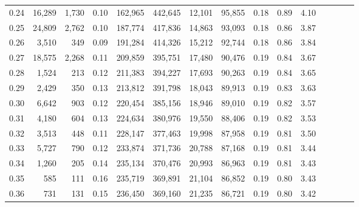 \begin{tabular}{rrrcrrrrrrrrrrr}
0.24 &  16,289 &  1,730 &                                       0.10 &  162,965 &  442,645 &   12,101 &   95,855 &  0.18 &  0.89 &                         4.10 \\
0.25 &  24,809 &  2,762 &                                       0.10 &  187,774 &  417,836 &   14,863 &   93,093 &  0.18 &  0.86 &                         3.87 \\
0.26 &   3,510 &    349 &                                       0.09 &  191,284 &  414,326 &   15,212 &   92,744 &  0.18 &  0.86 &                         3.84 \\
0.27 &  18,575 &  2,268 &                                       0.11 &  209,859 &  395,751 &   17,480 &   90,476 &  0.19 &  0.84 &                         3.67 \\
0.28 &   1,524 &    213 &                                       0.12 &  211,383 &  394,227 &   17,693 &   90,263 &  0.19 &  0.84 &                         3.65 \\
0.29 &   2,429 &    350 &                                       0.13 &  213,812 &  391,798 &   18,043 &   89,913 &  0.19 &  0.83 &                         3.63 \\
0.30 &   6,642 &    903 &                                       0.12 &  220,454 &  385,156 &   18,946 &   89,010 &  0.19 &  0.82 &                         3.57 \\
0.31 &   4,180 &    604 &                                       0.13 &  224,634 &  380,976 &   19,550 &   88,406 &  0.19 &  0.82 &                         3.53 \\
0.32 &   3,513 &    448 &                                       0.11 &  228,147 &  377,463 &   19,998 &   87,958 &  0.19 &  0.81 &                         3.50 \\
0.33 &   5,727 &    790 &                                       0.12 &  233,874 &  371,736 &   20,788 &   87,168 &  0.19 &  0.81 &                         3.44 \\
0.34 &   1,260 &    205 &                                       0.14 &  235,134 &  370,476 &   20,993 &   86,963 &  0.19 &  0.81 &                         3.43 \\
0.35 &     585 &    111 &                                       0.16 &  235,719 &  369,891 &   21,104 &   86,852 &  0.19 &  0.80 &                         3.43 \\
0.36 &     731 &    131 &                                       0.15 &  236,450 &  369,160 &   21,235 &   86,721 &  0.19 &  0.80 &                         3.42 \\

\end{tabular}
